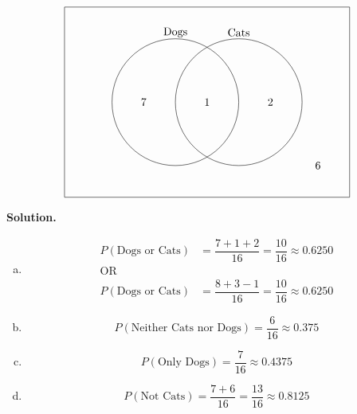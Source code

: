 \documentclass[12pt,letterpaper]{exam}
\begin{document}
\begin{questions}
 \pspace
	\[
	\begin{tikzpicture}
	\draw (0,0) rectangle (9,6);
	\draw (3.5,3) circle (2);
	\draw (5.5,3) circle (2);
	
	\node at (3.5,5.2) {Dogs};
	\node at (5.5,5.2) {Cats}; 
	
	\node at (2.5,3) {7};
	\node at (4.5,3) {1};
	\node at (6.5,3) {2};
	\node at (8,1) {6};
	\end{tikzpicture}
	\]

{\noindent\bfseries Solution.}

\begin{enumerate}[(a)]
\item 
	\[
	\begin{aligned}
	P(\text{Dogs or Cats})&= \dfrac{7 + 1 + 2}{16}= \dfrac{10}{16} \approx 0.6250 \\
	\text{OR} \\
	P(\text{Dogs or Cats})&= \dfrac{8 + 3 - 1}{16}= \dfrac{10}{16} \approx 0.6250
	\end{aligned}
	\] \vfill

\item 
	\[
	P(\text{Neither Cats nor Dogs})= \dfrac{6}{16} \approx 0.375
	\] \vfill

\item 
	\[
	P(\text{Only Dogs})= \dfrac{7}{16} \approx 0.4375
	\] \vfill

\item 
	\[
	P(\text{Not Cats})= \dfrac{7 + 6}{16}= \dfrac{13}{16} \approx 0.8125
	\] \vfill


\end{enumerate}
\end{questions}
\end{document}
